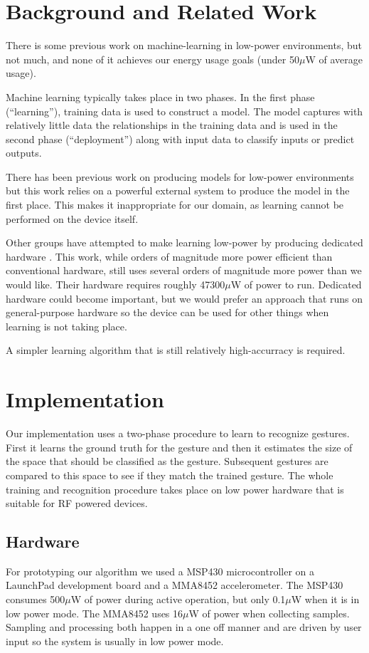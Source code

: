 \documentclass[12pt]{article}
\begin{document}
\section{Background and Related Work}

There is some previous work on machine-learning in low-power environments,
but not much, and none of it achieves our energy usage goals (under 50{$\mu$}W
of average usage).

Machine learning typically takes place in two phases. In the first phase
(``learning''), training data is used to construct a model. The model captures
with relatively little data the relationships in the training data and is used
in the second phase (``deployment'') along with input data to classify inputs
or predict outputs.

There has been previous work on producing models for low-power environments
\cite{low-power-models} but this work relies on a powerful external system to
produce the model in the first place. This makes it inappropriate for our
domain, as learning cannot be performed on the device itself.

Other groups have attempted to make learning low-power by producing dedicated
hardware \cite{ml-on-a-chip}. This work, while orders of magnitude more
power efficient than conventional hardware, still uses several
orders of magnitude more power than we would like. Their hardware requires
roughly 47300{$\mu$}W of power to run. Dedicated hardware could become
important, but we would prefer an approach that runs on general-purpose
hardware so the device can be used for other things when learning is not taking
place.

A simpler learning algorithm that is still relatively high-accurracy is
required.

\section{Implementation}

Our implementation uses a two-phase procedure to learn to recognize gestures. First it learns the ground truth for the gesture and then it estimates the size of the space that should be classified as the gesture. Subsequent gestures are compared to this space to see if they match the trained gesture. The whole training and recognition procedure takes place on low power hardware that is suitable for RF powered devices.

\subsection{Hardware}
For prototyping our algorithm we used a MSP430 microcontroller on a LaunchPad development board and a MMA8452 accelerometer. The MSP430 consumes 500{$\mu$}W of power during active operation, but only 0.1{$\mu$}W when it is in low power mode. The MMA8452 uses 16{$\mu$}W of power when collecting samples. Sampling and processing both happen in a one off manner and are driven by user input so the system is usually in low power mode.
\end{document}

